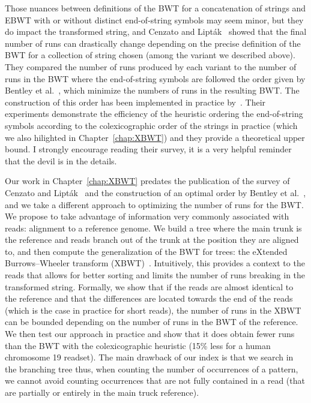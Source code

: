 Those nuances between definitions of the BWT for a concatenation of strings and EBWT with or without distinct end-of-string symbols may seem minor, but they do impact the transformed string, and 
Cenzato and Lipták~\cite{cenzato_et_al_BWT_Collections} showed that the final  number of runs can drastically change depending on the precise definition of the BWT for a collection of string chosen (among the variant we described above). 
They compared the number of runs produced by each variant to the number of runs in the BWT where the end-of-string symbols are followed the order given by Bentley et al.~\cite{bentley2019complexity}, which minimize the numbers of runs in the resulting BWT. The construction of this order has been implemented in practice by~\cite{cenzato2023computing}.
Their experiments demonstrate the efficiency of the heuristic ordering the end-of-string symbols according to the colexicographic order of the strings in practice (which we also hilighted in Chapter~\ref{chap:XBWT}) and they provide a theoretical upper bound. I strongly encourage reading their survey, it is a very helpful reminder that the devil is in the details.

Our work in Chapter~\ref{chap:XBWT} predates the publication of the survey of Cenzato and Lipták~\cite{cenzato_et_al_BWT_Collections} and the construction of an optimal order by Bentley et al.~\cite{bentley2019complexity}, and we take a different approach to optimizing the number of runs for the BWT. We propose to take advantage of information very commonly associated with reads: alignment to a reference genome. We build a tree where the main trunk is the reference and reads branch out of the trunk at the position they are aligned to, and then compute the generalization of the BWT for trees: the eXtended Burrows--Wheeler transform (XBWT)~\cite{ferragina2009compressing}. Intuitively, this provides a context to the reads that allows for better sorting and limits the number of runs breaking in the transformed string. Formally, we show that if the reads are almost identical to the reference and that the differences are located towards the end of the reads (which is the case in practice for short reads), the number of runs in the XBWT can be bounded depending on the number of runs in the BWT of the reference. We then test our approach in practice and show that it does obtain fewer runs than the BWT with the colexicographic heuristic (15\% less for a human chromosome 19 readset).
The main drawback of our index is that we search in the branching tree thus, when counting the number of occurrences of a pattern, we cannot avoid counting occurrences that are not fully contained in a read (that are partially or entirely in the main truck reference).

